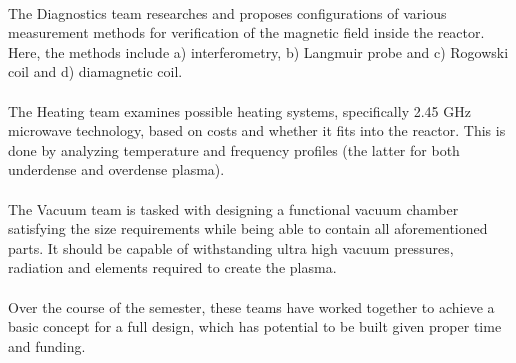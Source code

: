 \\
The Diagnostics team researches and proposes configurations of various measurement methods for verification of the magnetic field inside the reactor. Here, the methods include a) interferometry, b) Langmuir probe and c) Rogowski coil and d) diamagnetic coil.\\
\\
The Heating team examines possible heating systems, specifically 2.45 GHz microwave technology, based on costs and whether it fits into the reactor. This is done by analyzing temperature and frequency profiles (the latter for both underdense and overdense plasma).\\
\\
The Vacuum team is tasked with designing a functional vacuum chamber satisfying the size requirements while being able to contain all aforementioned parts. It should be capable of withstanding ultra high vacuum pressures, radiation and elements required to create the plasma.\\
\\
Over the course of the semester, these teams have worked together to achieve a basic concept for a full design, which has potential to be built given proper time and funding.